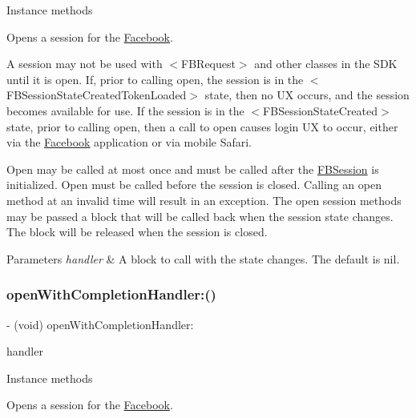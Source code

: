 Instance methods

Opens a session for the \hyperlink{interfaceFacebook}{Facebook}.

A session may not be used with $<$\+F\+B\+Request$>$ and other classes in the S\+DK until it is open. If, prior to calling open, the session is in the $<$\+F\+B\+Session\+State\+Created\+Token\+Loaded$>$ state, then no UX occurs, and the session becomes available for use. If the session is in the $<$\+F\+B\+Session\+State\+Created$>$ state, prior to calling open, then a call to open causes login UX to occur, either via the \hyperlink{interfaceFacebook}{Facebook} application or via mobile Safari.

Open may be called at most once and must be called after the {\ttfamily \hyperlink{interfaceFBSession}{F\+B\+Session}} is initialized. Open must be called before the session is closed. Calling an open method at an invalid time will result in an exception. The open session methods may be passed a block that will be called back when the session state changes. The block will be released when the session is closed.


\begin{DoxyParams}{Parameters}
{\em handler} & A block to call with the state changes. The default is nil. \\
\hline
\end{DoxyParams}
\mbox{\label{interfaceFBSession_a874152230789c87cd181d1f976e3715f}} 
\subsubsection{\texorpdfstring{open\+With\+Completion\+Handler\+:()}{openWithCompletionHandler:()}\hspace{0.1cm}{\footnotesize\ttfamily [2/5]}}
{\footnotesize\ttfamily -\/ (void) open\+With\+Completion\+Handler\+: \begin{DoxyParamCaption}\item[{(F\+B\+Session\+State\+Handler)}]{handler }\end{DoxyParamCaption}}

Instance methods

Opens a session for the \hyperlink{interfaceFacebook}{Facebook}.

